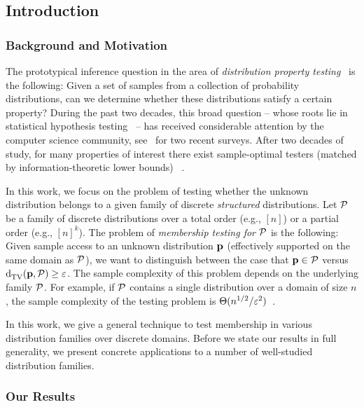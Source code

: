 \subsection{Introduction}  \label{sec:intro}
\subsubsection{Background and Motivation} \label{ssec:background}

The prototypical inference question in the area of \emph{distribution property testing}~\cite{BFRSW:00}
is the following: Given a set of samples from a collection of probability distributions, can we
determine whether these distributions satisfy a certain property?
During the past two decades, this broad
question -- whose roots lie in statistical hypothesis testing~\cite{NeymanP, lehmann2005testing} --
has received considerable attention by the computer science community,
see~\cite{Rubinfeld:12:Taming, Canonne15} for two recent surveys.
After two decades of study, for many properties of interest there exist
sample-optimal testers (matched by information-theoretic lower bounds)
~\cite{Paninski:08, CDVV:14, VV:14, DKN:15, DK:16}.

In this work, we focus on the problem of testing whether the unknown distribution
belongs to a given family of discrete \emph{structured} distributions.
Let $\mathcal{P}$ be a family of discrete distributions over a total order (e.g., $[n]$)
or a partial order (e.g., $[n]^k$). 
The problem of \emph{membership testing for $\mathcal{P}$} is the following:
Given sample access to an unknown distribution $\mathbf{p}$ (effectively supported 
on the same domain as $\mathcal{P}$),
we want to distinguish between the case that $\mathbf{p} \in \mathcal{P}$ versus ${\operatorname{d}_{\textrm{TV}}^{}\!\left({\mathbf{p}, \mathcal{P}}\right)} \geq \varepsilon$. 
The sample complexity of this problem depends on the underlying family
$\mathcal{P}$. For example, if $\cal P$ contains a single distribution over a domain of size $n$,
the sample complexity of the testing problem is $\Theta(n^{1/2}/\varepsilon^2)$~\cite{CDVV:14, DKN:15}.

In this work, we give a general technique to test membership in various distribution families over discrete domains.
Before we state our results in full generality, we present concrete applications to 
a number of well-studied distribution families.

\subsubsection{Our Results} \label{ssec:results}

